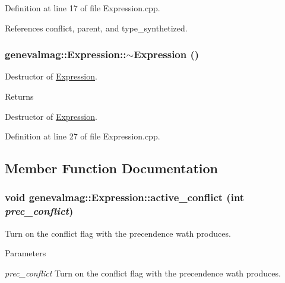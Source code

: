 Definition at line 17 of file Expression.cpp.



References conflict, parent, and type\_\-synthetized.

\hypertarget{classgenevalmag_1_1Expression_a9ab15992e6a819e8e683745069bcf15b}{
\subsubsection[{$\sim$Expression}]{\setlength{\rightskip}{0pt plus 5cm}genevalmag::Expression::$\sim$Expression ()}}
\label{classgenevalmag_1_1Expression_a9ab15992e6a819e8e683745069bcf15b}
Destructor of \hyperlink{classgenevalmag_1_1Expression}{Expression}. \begin{DoxyReturn}{Returns}

\end{DoxyReturn}
Destructor of \hyperlink{classgenevalmag_1_1Expression}{Expression}. 

Definition at line 27 of file Expression.cpp.



\subsection{Member Function Documentation}
\hypertarget{classgenevalmag_1_1Expression_a6c1265f335e85346c23556cc361c4aad}{
\subsubsection[{active\_\-conflict}]{\setlength{\rightskip}{0pt plus 5cm}void genevalmag::Expression::active\_\-conflict (int {\em prec\_\-conflict})}}
\label{classgenevalmag_1_1Expression_a6c1265f335e85346c23556cc361c4aad}
Turn on the conflict flag with the precendence wath produces. 
\begin{DoxyParams}{Parameters}
\item[{\em prec\_\-conflict}]Turn on the conflict flag with the precendence wath produces. \end{DoxyParams}


